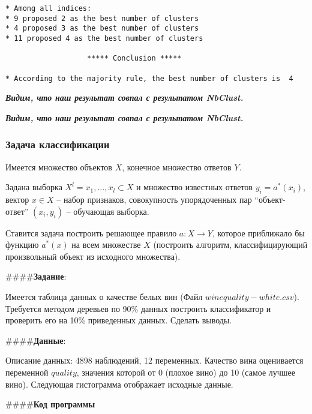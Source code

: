 \documentclass[
]{article}
\begin{document}
\begin{verbatim}
* Among all indices:                                                
* 9 proposed 2 as the best number of clusters 
* 4 proposed 3 as the best number of clusters 
* 11 proposed 4 as the best number of clusters 

                   ***** Conclusion *****                            
 
* According to the majority rule, the best number of clusters is  4 
\end{verbatim}

\textbf{\emph{Видим, что наш результат совпал с результатом NbClust.}}

\textbf{\emph{Видим, что наш результат совпал с результатом NbClust.}}

\hypertarget{ux437ux430ux434ux430ux447ux430-ux43aux43bux430ux441ux441ux438ux444ux438ux43aux430ux446ux438ux438}{%
\subsubsection{\texorpdfstring{\textbf{Задача
классификации}}{Задача классификации}}\label{ux437ux430ux434ux430ux447ux430-ux43aux43bux430ux441ux441ux438ux444ux438ux43aux430ux446ux438ux438}}

Имеется множество объектов \(X\), конечное множество ответов \(Y\).

Задана выборка \(X^l={x_1,…,x_l }⊂X\) и множество известных ответов
\(y_i=a^*(x_i)\), вектор \(x∈X\) -- набор признаков, совокупность
упорядоченных пар ``объект-ответ'' \((x_i,y_i)\) -- обучающая выборка.

Ставится задача построить решающее правило \(a:X→Y\), которое приближало
бы функцию \(a^* (x)\) на всем множестве \(X\) (построить алгоритм,
классифицирующий произвольный объект из исходного множества).

\#\#\#\#\textbf{Задание}:

Имеется таблица данных о качестве белых вин (Файл
\(winequality-white.csv\)). Требуется методом деревьев по 90\% данных
построить классификатор и проверить его на 10\% приведенных данных.
Сделать выводы.

\#\#\#\#\textbf{Данные}:

Описание данных: 4898 наблюдений, 12 переменных. Качество вина
оценивается переменной \(quality\), значения которой от 0 (плохое вино)
до 10 (самое лучшее вино). Следующая гистограмма отображает исходные
данные.

\#\#\#\#\textbf{Код программы}
\end{document}

